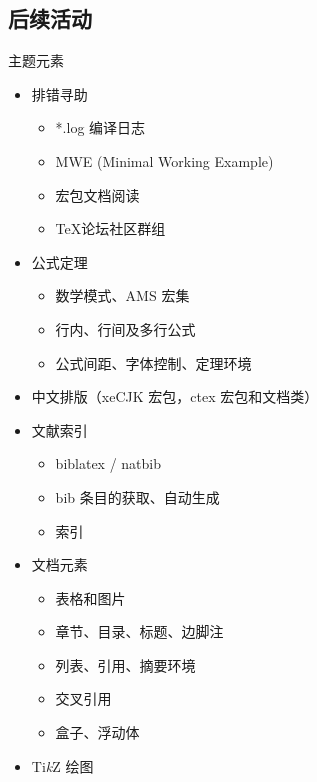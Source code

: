 \documentclass{beamer}
\newcommand{\opt}[1]{{\color{gray} #1}}
\begin{document}
\subsection{后续活动}
\begin{frame}[allowframebreaks]{主题元素}
\begin{Form}
    \begin{itemize}[label = {\CheckBox[width=.12in,height=.12in,bordercolor=blue]{}}]
    \item 排错寻助
        \begin{itemize}[label = {\CheckBox[width=.1in,height=.1in,bordercolor=cyan]{}}]
        \item \opt{*.log 编译日志}
        \item MWE (Minimal Working Example)
        \item 宏包文档阅读
        \item \TeX 论坛社区群组
        \end{itemize}
    \item 公式定理
        \begin{itemize}[label = {\CheckBox[width=.1in,height=.1in,bordercolor=cyan]{}}]
        \item 数学模式、AMS 宏集
        \item 行内、行间及多行公式
        \item \opt{公式间距、字体控制、定理环境}
        \end{itemize}
    \item 中文排版（xeCJK 宏包，ctex 宏包和文档类）
    \item 文献索引
        \begin{itemize}[label = {\CheckBox[width=.1in,height=.1in,bordercolor=cyan]{}}]
        \item biblatex / natbib
        \item bib 条目的获取、自动生成
        \item \opt{索引}
        \end{itemize}
    \item 文档元素
        \begin{itemize}[label = {\CheckBox[width=.1in,height=.1in,bordercolor=cyan]{}}]
        \item 表格和图片
        \item 章节、目录、标题、边脚注
        \item 列表、引用、摘要环境
        \item 交叉引用
        \item \opt{盒子、浮动体}
        \end{itemize}
    \item \opt{Ti\emph{k}Z 绘图}
    \end{itemize}
\end{Form}
\end{frame}
\end{document}
